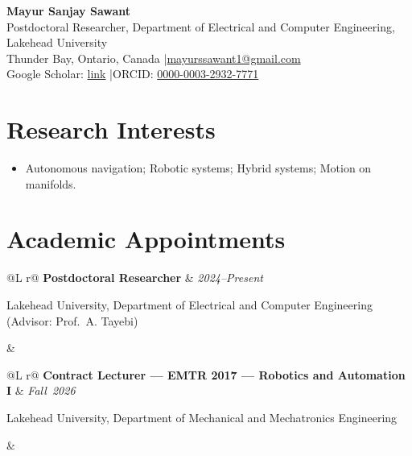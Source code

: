 \documentclass[10pt]{article}
\makeatletter
\newcommand{\CVName}[1]{{\huge\bfseries #1}}
\newcommand{\CVLine}[1]{{\small #1}}
\newcommand{\CVSection}[1]{\section*{#1}\vspace{-2pt}}
\newcommand{\Entry}[3]{%
  \begin{tabularx}{\textwidth}{@{}L r@{}}
    \textbf{#1} & \textit{\mbox{#3}}\\[-2pt]
    \parbox[t]{\linewidth}{\setlength{\parskip}{0pt}#2} &
  \end{tabularx}\par
}
\newcommand{\EntryItem}[1]{\begin{itemize}\item #1\end{itemize}}
\makeatother
\begin{document}
\CVName{Mayur Sanjay Sawant}\\[2pt]
\CVLine{Postdoctoral Researcher, Department of Electrical and Computer Engineering, Lakehead University}\\
\CVLine{Thunder Bay, Ontario, Canada \quad|\quad \href{mailto:mayurssawant1@gmail.com}{mayurssawant1@gmail.com}}\\
 \CVLine{
Google Scholar: \href{https://scholar.google.ca/citations?user=w9_rwx0AAAAJ&hl=en&oi=ao}{link} \quad|\quad ORCID: \href{https://orcid.org/0000-0003-2932-7771}{0000-0003-2932-7771}}

\vspace{6pt}


\CVSection{Research Interests}
\begin{itemize}
  \item Autonomous navigation; Robotic systems; Hybrid systems; Motion on manifolds.
\end{itemize}

\CVSection{Academic Appointments}
\Entry{Postdoctoral Researcher}{Lakehead University, Department of Electrical and Computer Engineering (Advisor: Prof.~A. Tayebi)}{2024--Present}
	\Entry{Contract Lecturer --- EMTR 2017 --- Robotics and Automation I}{Lakehead University, Department of Mechanical and Mechatronics Engineering}{Fall~2026}

\end{document}
